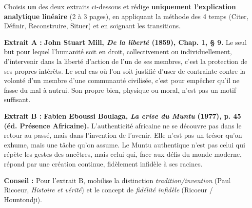 \documentclass[11pt]{article}
\begin{document}
\begin{exercice}
Choisis \textbf{un} des deux extraits ci-dessous et rédige \textbf{uniquement l'explication analytique linéaire} (2 à 3 pages), en appliquant la méthode des 4 temps (Citer, Définir, Reconstruire, Situer) et en soignant les transitions.

\textbf{Extrait A :} \textbf{John Stuart Mill, \emph{De la liberté} (1859), Chap. 1, § 9.}
\guillemotleft Le seul but pour lequel l'humanité soit en droit, collectivement ou individuellement, d'intervenir dans la liberté d'action de l'un de ses membres, c'est la protection de ses propres intérêts. Le seul cas où l'on soit justifié d'user de contrainte contre la volonté d'un membre d'une communauté civilisée, c'est pour empêcher qu'il ne fasse du mal à autrui. Son propre bien, physique ou moral, n'est pas un motif suffisant. \guillemotright

\textbf{Extrait B :} \textbf{Fabien Eboussi Boulaga, \emph{La crise du Muntu} (1977), p. 45 (éd. Présence Africaine).}
\guillemotleft L'authenticité africaine ne se découvre pas dans le retour au passé, mais dans l'invention de l'avenir. Elle n'est pas un trésor qu'on exhume, mais une tâche qu'on assume. Le Muntu authentique n'est pas celui qui répète les gestes des ancêtres, mais celui qui, face aux défis du monde moderne, répond par une création continue, fidèlement infidèle à ses racines. \guillemotright

\textbf{Conseil :} Pour l'extrait B, mobilise la distinction \emph{tradition/invention} (Paul Ricoeur, \emph{Histoire et vérité}) et le concept de \emph{fidélité infidèle} (Ricoeur / Hountondji).
\end{exercice}
\end{document}
